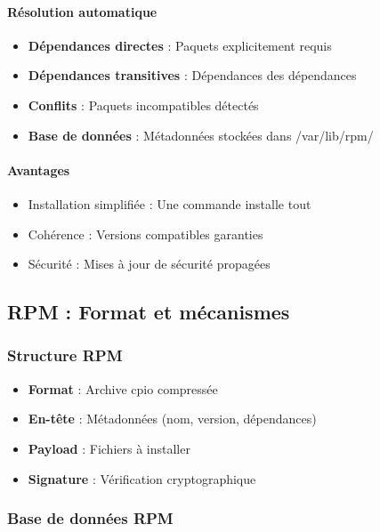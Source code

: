 \documentclass[12pt,a4paper]{article}
\begin{document}
\paragraph{Résolution automatique}
\begin{itemize}
    \item \textbf{Dépendances directes} : Paquets explicitement requis
    \item \textbf{Dépendances transitives} : Dépendances des dépendances
    \item \textbf{Conflits} : Paquets incompatibles détectés
    \item \textbf{Base de données} : Métadonnées stockées dans /var/lib/rpm/
\end{itemize}

\paragraph{Avantages}
\begin{itemize}
    \item Installation simplifiée : Une commande installe tout
    \item Cohérence : Versions compatibles garanties
    \item Sécurité : Mises à jour de sécurité propagées
\end{itemize}

\subsection{RPM : Format et mécanismes}

\subsubsection{Structure RPM}

\begin{itemize}
    \item \textbf{Format} : Archive cpio compressée
    \item \textbf{En-tête} : Métadonnées (nom, version, dépendances)
    \item \textbf{Payload} : Fichiers à installer
    \item \textbf{Signature} : Vérification cryptographique
\end{itemize}

\subsubsection{Base de données RPM}
\end{document}
